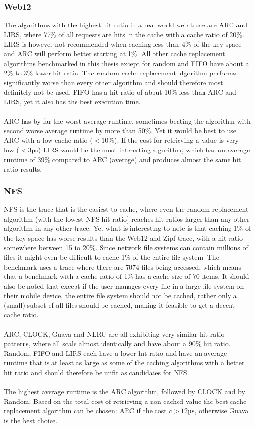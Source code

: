 \documentclass[pdftex,a4paper,12pt,twoside]{report}
\begin{document}
\subsubsection{Web12}
The algorithms with the highest hit ratio in a real world web trace are ARC and LIRS, where 77\% of all requests are hits in the cache with a cache ratio of 20\%. LIRS is however not recommended when caching less than 4\% of the key space and ARC will perform better starting at 1\%. All other cache replacement algorithms benchmarked in this thesis except for random and FIFO have about a 2\% to 3\% lower hit ratio. The random cache replacement algorithm performs significantly worse than every other algorithm and should therefore most definitely not be used, FIFO has a hit ratio of about 10\% less than ARC and LIRS, yet it also has the best execution time.
\\\\
ARC has by far the worst average runtime, sometimes beating the algorithm with second worse average runtime by more than 50\%. Yet it would be best to use ARC with a low cache ratio ($<10\%$). If the cost for retrieving a value is very low ($<3\text{µs}$) LIRS would be the most interesting algorithm, which has an average runtime of 39\% compared to ARC (average) and produces almost the same hit ratio results.
\subsubsection{NFS}
NFS is the trace that is the easiest to cache, where even the random replacement algorithm (with the lowest NFS hit ratio) reaches hit ratios larger than any other algorithm in any other trace. Yet what is interesting to note is that caching 1\% of the key space has worse results than the Web12 and Zipf trace, with a hit ratio somewhere between 15 to 20\%. Since network file systems can contain millions of files it might even be difficult to cache 1\% of the entire file system. The benchmark uses a trace where there are 7074 files being accessed, which means that a benchmark with a cache ratio of 1\% has a cache size of 70 items. It should also be noted that except if the user manages every file in a large file system on their mobile device, the entire file system should not be cached, rather only a (small) subset of all files should be cached, making it feasible to get a decent cache ratio.
\\\\
ARC, CLOCK, Guava and NLRU are all exhibiting very similar hit ratio patterns, where all scale almost identically and have about a 90\% hit ratio. Random, FIFO and LIRS each have a lower hit ratio and have an average runtime that is at least as large as some of the caching algorithms with a better hit ratio and should therefore be unfit as candidates for NFS.
\\\\
The highest average runtime is the ARC algorithm, followed by CLOCK and by Random. Based on the total cost of retrieving a non-cached value the best cache replacement algorithm can be chosen: ARC if the cost $c > 12\text{µs}$, otherwise Guava is the best choice.
\end{document}
